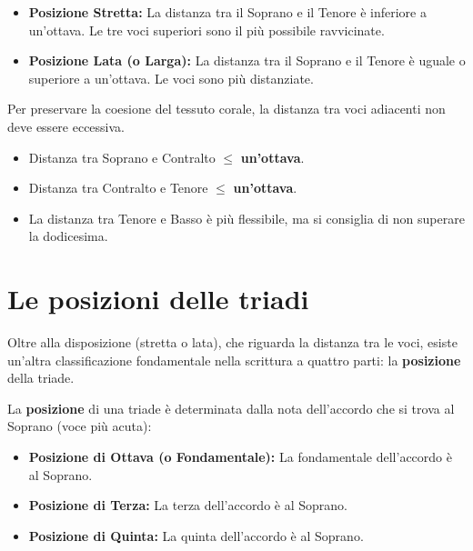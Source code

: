 \begin{definizione}
	\label{def:posizione_stretta_lata}
	\begin{itemize}
		\item \textbf{Posizione Stretta:} La distanza tra il Soprano e il Tenore è inferiore a un'ottava. Le tre voci superiori sono il più possibile ravvicinate.
		\item \textbf{Posizione Lata (o Larga):} La distanza tra il Soprano e il Tenore è uguale o superiore a un'ottava. Le voci sono più distanziate.
	\end{itemize}
\end{definizione}

\begin{regola}
	\label{reg:distanza_voci}
	Per preservare la coesione del tessuto corale, la distanza tra voci adiacenti non deve essere eccessiva.
	\begin{itemize}
		\item Distanza tra Soprano e Contralto $\le$ \textbf{un'ottava}.
		\item Distanza tra Contralto e Tenore $\le$ \textbf{un'ottava}.
		\item La distanza tra Tenore e Basso è più flessibile, ma si consiglia di non superare la dodicesima.
	\end{itemize}
\end{regola}

\section{Le posizioni delle triadi}
\label{sec:posizioni_triadi}

Oltre alla disposizione (stretta o lata), che riguarda la distanza tra le voci, esiste un'altra classificazione fondamentale nella scrittura a quattro parti: la \textbf{posizione} della triade.

\begin{definizione}
	\label{def:posizione_triade}
	La \textbf{posizione} di una triade è determinata dalla nota dell'accordo che si trova al Soprano (voce più acuta):
	\begin{itemize}
		\item \textbf{Posizione di Ottava (o Fondamentale):} La fondamentale dell'accordo è al Soprano.
		\item \textbf{Posizione di Terza:} La terza dell'accordo è al Soprano.
		\item \textbf{Posizione di Quinta:} La quinta dell'accordo è al Soprano.
	\end{itemize}
\end{definizione}

